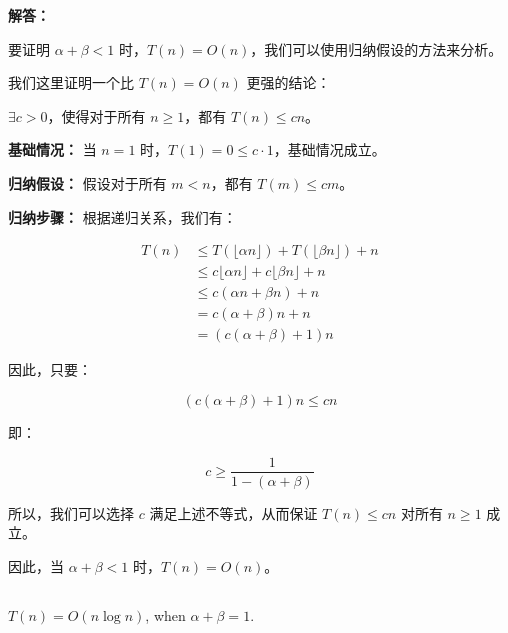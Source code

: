 ﻿\documentclass[12pt,a4paper]{article}
\begin{document}
\begin{answerbox}
\textbf{解答：}

要证明 $\alpha + \beta < 1$ 时，$T(n)=O(n)$，我们可以使用归纳假设的方法来分析。

我们这里证明一个比 $T(n)=O(n)$ 更强的结论：

$\exists c > 0$，使得对于所有 $n \geq 1$，都有 $T(n) \leq cn$。

\textbf{基础情况：} 当 $n=1$ 时，$T(1)=0 \leq c \cdot 1$，基础情况成立。

\textbf{归纳假设：} 假设对于所有 $m < n$，都有 $T(m) \leq cm$。

\textbf{归纳步骤：} 根据递归关系，我们有：

$$
\begin{aligned}
T(n) &\leq T(\lfloor \alpha n \rfloor) + T(\lfloor \beta n \rfloor) + n \\
&\leq c \lfloor \alpha n \rfloor + c \lfloor \beta n \rfloor + n \quad  \\
&\leq c (\alpha n + \beta n) + n \\
&= c (\alpha + \beta) n + n \\
&= (c (\alpha + \beta) + 1) n
\end{aligned}
$$

因此，只要：

$$
(c (\alpha + \beta) + 1) n \leq cn
$$

即：

$$
c \geq \frac{1}{1-(\alpha + \beta)}
$$

所以，我们可以选择 $c$ 满足上述不等式，从而保证 $T(n) \leq cn$ 对所有 $n \geq 1$ 成立。

因此，当 $\alpha + \beta < 1$ 时，$T(n)=O(n)$。
\end{answerbox}

\subsection{}

$T(n)=O(n\log n)$, when $\alpha + \beta = 1$.
\end{document}
